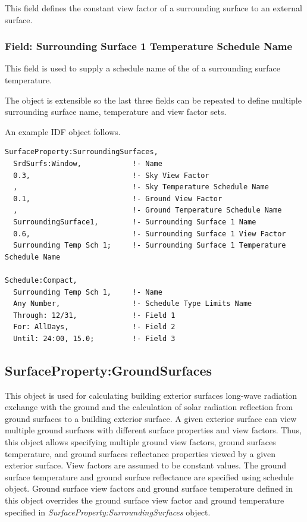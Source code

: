 This field defines the constant view factor of a surrounding surface to an external surface.

\subsubsection{Field: Surrounding Surface 1 Temperature Schedule Name}\label{field-surrounding-surface-1-temp-schedule-name}

This field is used to supply a schedule name of the of a surrounding surface temperature.

The object is extensible so the last three fields can be repeated to define multiple surrounding surface name, temperature and view factor sets.

An example IDF object follows.

\begin{lstlisting}
SurfaceProperty:SurroundingSurfaces,
  SrdSurfs:Window,            !- Name
  0.3,                        !- Sky View Factor
  ,                           !- Sky Temperature Schedule Name
  0.1,                        !- Ground View Factor
  ,                           !- Ground Temperature Schedule Name
  SurroundingSurface1,        !- Surrounding Surface 1 Name
  0.6,                        !- Surrounding Surface 1 View Factor
  Surrounding Temp Sch 1;     !- Surrounding Surface 1 Temperature Schedule Name

Schedule:Compact,
  Surrounding Temp Sch 1,     !- Name
  Any Number,                 !- Schedule Type Limits Name
  Through: 12/31,             !- Field 1
  For: AllDays,               !- Field 2
  Until: 24:00, 15.0;         !- Field 3
\end{lstlisting}

\subsection{SurfaceProperty:GroundSurfaces}\label{surfacePropertyGroundSurfaces}

This object is used for calculating building exterior surfaces long-wave radiation exchange with the ground and the calculation of solar radiation reflection from ground surfaces to a building exterior surface. A given exterior surface can view multiple ground surfaces with different surface properties and view factors. Thus, this object allows specifying multiple ground view factors, ground surfaces temperature, and ground surfaces reflectance properties viewed by a given exterior surface. View factors are assumed to be constant values. The ground surface temperature and ground surface reflectance are specified using schedule object. Ground surface view factors and ground surface temperature defined in this object overrides the ground surface view factor and ground temperature specified in \textit{SurfaceProperty:SurroundingSurfaces} object.

